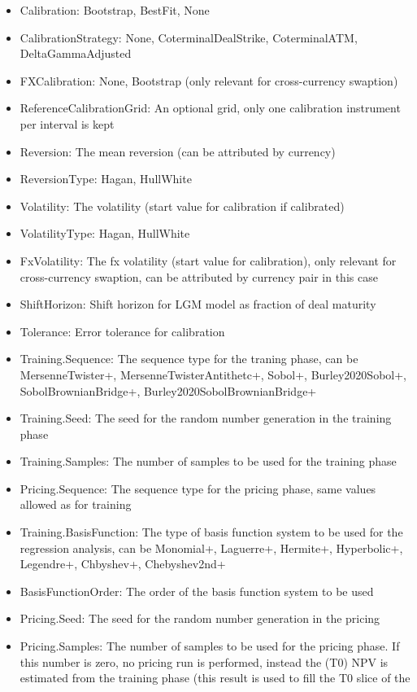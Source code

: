 \begin{itemize}
\item Calibration: Bootstrap, BestFit, None
\item CalibrationStrategy: None, CoterminalDealStrike, CoterminalATM, DeltaGammaAdjusted
\item FXCalibration: None, Bootstrap (only relevant for cross-currency swaption)
\item ReferenceCalibrationGrid: An optional grid, only one calibration instrument per interval is kept
\item Reversion: The mean reversion (can be attributed by currency)
\item ReversionType: Hagan, HullWhite
\item Volatility: The volatility (start value for calibration if calibrated)
\item VolatilityType: Hagan, HullWhite
\item FxVolatility: The fx volatility (start value for calibration), only relevant for cross-currency swaption, can be
  attributed by currency pair in this case
\item ShiftHorizon: Shift horizon for LGM model as fraction of deal maturity
\item Tolerance: Error tolerance for calibration
\item Training.Sequence: The sequence type for the traning phase, can be MersenneTwister+, MersenneTwisterAntithetc+,
  Sobol+, Burley2020Sobol+, SobolBrownianBridge+, Burley2020SobolBrownianBridge+
\item Training.Seed: The seed for the random number generation in the training phase
\item Training.Samples: The number of samples to be used for the training phase
\item Pricing.Sequence: The sequence type for the pricing phase, same values allowed as for training
\item Training.BasisFunction: The type of basis function system to be used for the regression analysis, can be
  Monomial+, Laguerre+, Hermite+, Hyperbolic+, Legendre+, Chbyshev+, Chebyshev2nd+
\item BasisFunctionOrder: The order of the basis function system to be used
\item Pricing.Seed: The seed for the random number generation in the pricing
\item Pricing.Samples: The number of samples to be used for the pricing phase. If this number is zero, no pricing run is
  performed, instead the (T0) NPV is estimated from the training phase (this result is used to fill the T0 slice of the

\end{itemize}

